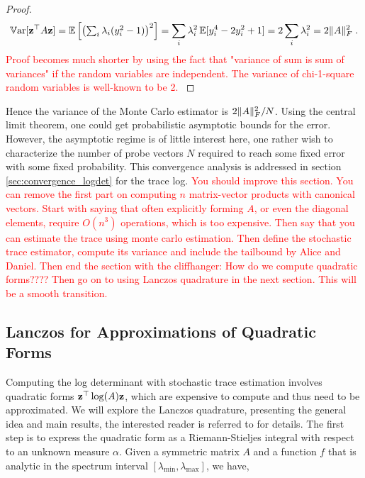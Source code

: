 \documentclass{article}
\begin{document}
{\begin{proof}
\begin{equation*}
    \operatorname{\mathbb{V}ar}[\boldsymbol{\mathbf{z}}^\top A \boldsymbol{\mathbf{z}}] = \operatorname{\mathbb{E}}\left[ \left( \textstyle\sum_i \lambda_i(y_i^2 - 1) \right)^2 \right] = \sum_i \lambda_i^2 \operatorname{\mathbb{E}}[y_i^4 - 2y_i^2 + 1] = 2\sum_i \lambda_i^2 = 2 \Vert A \Vert_F^2 \; .
\end{equation*}
\textcolor{red}{Proof becomes much shorter by using the fact that "variance of sum is sum of variances" if the random variables are independent. The variance of chi-1-square random variables is well-known to be 2. }
\end{proof}

Hence the variance of the Monte Carlo estimator is $2\Vert A \Vert_F^2 / N$. Using the central limit theorem, one could get probabilistic asymptotic bounds for the error. However, the asymptotic regime is of little interest here, one rather wish to characterize the number of probe vectors $N$ required to reach some fixed error with some fixed probability. This convergence analysis is addressed in section \ref{sec:convergence_logdet} for the trace log. 
\textcolor{red}{You should improve this section. You can remove the first part on computing $n$ matrix-vector products with canonical vectors. Start with saying that often explicitly forming $A$, or even the diagonal elements, require $O(n^3)$ operations, which is too expensive. Then say that you can estimate the trace using monte carlo estimation. Then define the stochastic trace estimator, compute its variance and include the tailbound by Alice and Daniel. Then end the section with the cliffhanger: How do we compute quadratic forms???? Then go on to using Lanczos quadrature in the next section. This will be a smooth transition.}


\subsection{Lanczos for Approximations of Quadratic Forms} \label{sec:lanczos_quadrature}

Computing the log determinant with stochastic trace estimation involves  quadratic forms $\boldsymbol{\mathbf{z}}^\top \log(A) \boldsymbol{\mathbf{z}}$, which are expensive to compute and thus need to be approximated. We will explore the Lanczos quadrature, presenting the general idea and main results, the interested reader is referred to \cite{golub_matrices_2010} for details. The first step is to express the quadratic form as a Riemann-Stieljes integral with respect to an unknown measure $\alpha$. Given a symmetric matrix $A$ and a function $f$ that is analytic in the spectrum interval $[\lambda_{\min}, \lambda_{\max}]$, we have,

}
\end{document}
